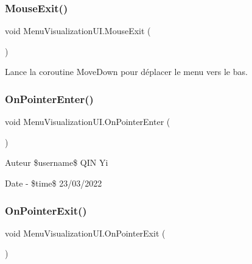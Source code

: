 \subsubsection{\texorpdfstring{Mouse\+Exit()}{MouseExit()}}
{\footnotesize\ttfamily void Menu\+Visualization\+U\+I.\+Mouse\+Exit (\begin{DoxyParamCaption}{ }\end{DoxyParamCaption})\hspace{0.3cm}{\ttfamily [inline]}}



Lance la coroutine Move\+Down pour déplacer le menu vers le bas. 

\mbox{\label{class_menu_visualization_u_i_aeb3cdd54092efba28c3a0c693dd64040}} 
\subsubsection{\texorpdfstring{On\+Pointer\+Enter()}{OnPointerEnter()}}
{\footnotesize\ttfamily void Menu\+Visualization\+U\+I.\+On\+Pointer\+Enter (\begin{DoxyParamCaption}{ }\end{DoxyParamCaption})\hspace{0.3cm}{\ttfamily [inline]}}

\begin{DoxyAuthor}{Auteur}
\$username\$ Q\+IN Yi 
\end{DoxyAuthor}
\begin{DoxyDate}{Date}
-\/ \$time\$ 23/03/2022 
\end{DoxyDate}
\mbox{\label{class_menu_visualization_u_i_a6ebf2452335526b9d63b69ce420d2365}} 
\subsubsection{\texorpdfstring{On\+Pointer\+Exit()}{OnPointerExit()}}
{\footnotesize\ttfamily void Menu\+Visualization\+U\+I.\+On\+Pointer\+Exit (\begin{DoxyParamCaption}{ }\end{DoxyParamCaption})\hspace{0.3cm}{\ttfamily [inline]}}



